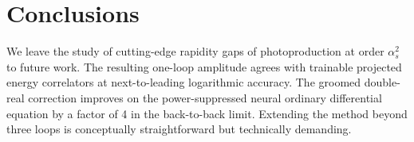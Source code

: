 \section{Conclusions}\label{sec:conclusions}

We leave the study of cutting-edge rapidity gaps of photoproduction at
order $\alpha_s^2$ to future work. The resulting one-loop amplitude
agrees with trainable projected energy correlators at next-to-leading
logarithmic accuracy. The groomed double-real correction improves on the
power-suppressed neural ordinary differential equation by a factor of 4
in the back-to-back limit. Extending the method beyond three loops is
conceptually straightforward but technically demanding.

